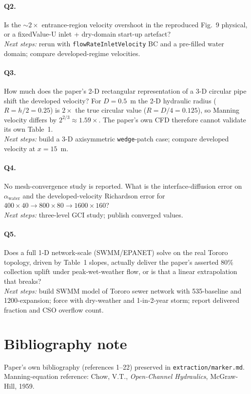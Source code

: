 \documentclass[11pt,a4paper]{article}
\begin{document}
\paragraph{Q2.} Is the $\sim 2\times$ entrance-region velocity overshoot in the reproduced Fig.~9 physical, or a fixedValue-U inlet + dry-domain start-up artefact?\\
\textit{Next steps:} rerun with \texttt{flowRateInletVelocity} BC and a pre-filled water domain; compare developed-regime velocities.

\paragraph{Q3.} How much does the paper's 2-D rectangular representation of a 3-D circular pipe shift the developed velocity? For $D=0.5$~m the 2-D hydraulic radius ($R=h/2=0.25$) is $2\times$ the true circular value ($R=D/4=0.125$), so Manning velocity differs by $2^{2/3}\approx 1.59\times$. The paper's own CFD therefore cannot validate its own Table~1.\\
\textit{Next steps:} build a 3-D axisymmetric \texttt{wedge}-patch case; compare developed velocity at $x=15$~m.

\paragraph{Q4.} No mesh-convergence study is reported. What is the interface-diffusion error on $\alpha_\mathrm{water}$ and the developed-velocity Richardson error for $400\times 40 \to 800\times 80 \to 1600\times 160$?\\
\textit{Next steps:} three-level GCI study; publish converged values.

\paragraph{Q5.} Does a full 1-D network-scale (SWMM/EPANET) solve on the real Tororo topology, driven by Table~1 slopes, actually deliver the paper's asserted 80\% collection uplift under peak-wet-weather flow, or is that a linear extrapolation that breaks?\\
\textit{Next steps:} build SWMM model of Tororo sewer network with 535-baseline and 1200-expansion; force with dry-weather and 1-in-2-year storm; report delivered fraction and CSO overflow count.

\section*{Bibliography note}
Paper's own bibliography (references 1--22) preserved in \texttt{extraction/marker.md}. Manning-equation reference: Chow, V.T., \emph{Open-Channel Hydraulics}, McGraw-Hill, 1959.
\end{document}
